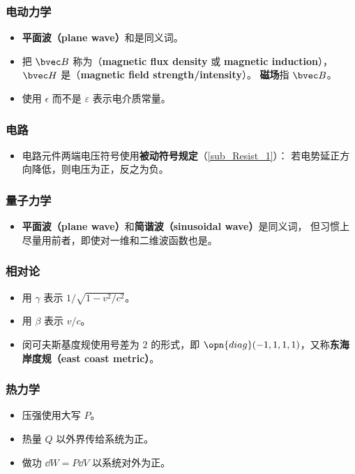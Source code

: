 \subsubsection{电动力学}
\begin{itemize}
\item \textbf{平面波（plane wave）}和是同义词。
\item 把 $\bvec B$ 称为（\textbf{magnetic flux density} 或 \textbf{magnetic induction}）， $\bvec H$ 是（\textbf{magnetic field strength/intensity}）。 \textbf{磁场}指 $\bvec B$。
\item 使用 $\epsilon$ 而不是 $\varepsilon$ 表示电介质常量。
\end{itemize}

\subsubsection{电路}
\begin{itemize}
\item 电路元件两端电压符号使用\textbf{被动符号规定}（\autoref{sub_Resist_1}）： 若电势延正方向降低，则电压为正，反之为负。
\end{itemize}

\subsubsection{量子力学}
\begin{itemize}
\item \textbf{平面波（plane wave）}和\textbf{简谐波（sinusoidal wave）}是同义词， 但习惯上尽量用前者，即使对一维和二维波函数也是。
\end{itemize}

\subsubsection{相对论}
\begin{itemize}
\item 用 $\gamma$ 表示 $1/\sqrt{1 - v^2/c^2}$。
\item 用 $\beta$ 表示 $v/c$。
\item 闵可夫斯基度规使用号差为 $2$ 的形式，即 $\opn{diag}(-1, 1, 1, 1)$，又称\textbf{东海岸度规（east coast metric）}。
\end{itemize}

\subsubsection{热力学}
\begin{itemize}
\item 压强使用大写 $P$。
\item 热量 $Q$ 以外界传给系统为正。
\item 做功 $\dd{W} = P\dd{V}$ 以系统对外为正。
\end{itemize}

